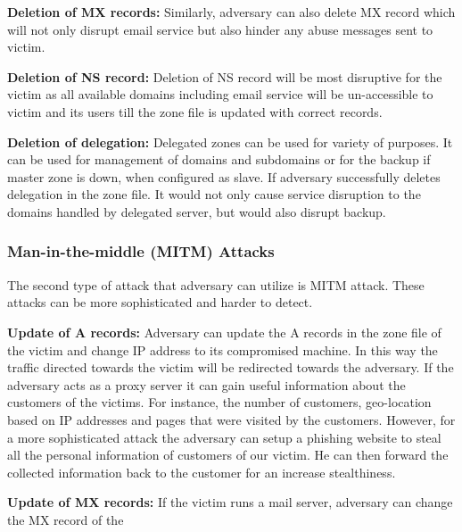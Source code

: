 \textbf{Deletion of MX records:} Similarly, adversary can also delete MX record which will not only disrupt email service but also hinder any abuse messages sent to victim.  

\textbf{Deletion of NS record:} Deletion of NS record will be most disruptive for the victim as all available domains including email service will be un-accessible to victim and its users till the zone file is updated with correct records. 

 \textbf{Deletion of delegation:} Delegated zones can be used for variety of purposes. It can be used for management of domains and subdomains or for the backup if master zone is down,  when configured as slave. If adversary successfully deletes delegation in the zone file. It would not only cause service disruption to the  domains handled by delegated server, but would also disrupt backup. 


\subsubsection{Man-in-the-middle (MITM) Attacks}
The second type of attack that adversary can utilize is MITM attack. These attacks can be more sophisticated and harder to detect. 

\textbf{Update of A records:}
Adversary can update the A records in the zone file of the victim and change IP address to its compromised machine. In this way the traffic directed towards the victim will be redirected towards the adversary. If the adversary acts as a proxy server it can gain useful information about the customers of the victims. For instance, the number of customers, geo-location based on IP addresses and pages that were visited by the customers. However, for a more sophisticated attack the adversary can setup a phishing website to steal all the personal information of customers of our victim. He can then forward the collected information back to the customer for an increase stealthiness. 

\textbf{Update of MX records:} 
If the victim runs a mail server, adversary can change the MX record of the 






